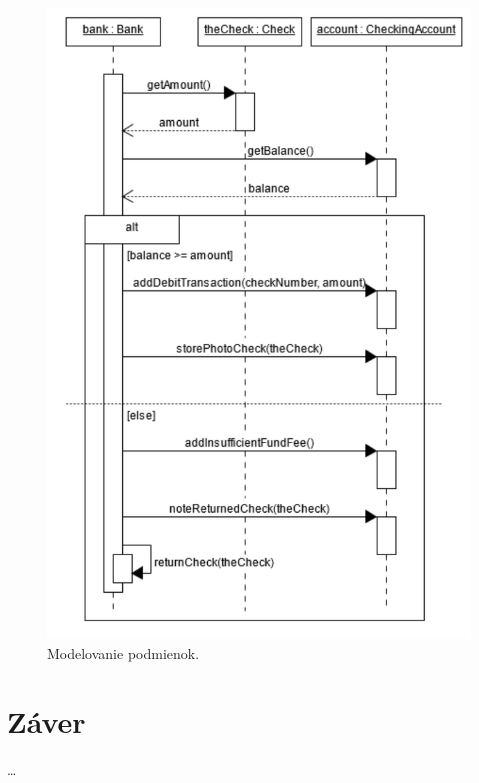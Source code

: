 \documentclass[10pt,slovak,a4paper]{article}
\begin{document}
\begin{figure}[tbh]
\centering
\includegraphics[scale=0.8]{cond_diag.pdf}
\caption{Modelovanie podmienok. \cite{booch00}}
\end{figure}

\section{Záver}
\ldots




\end{document}
